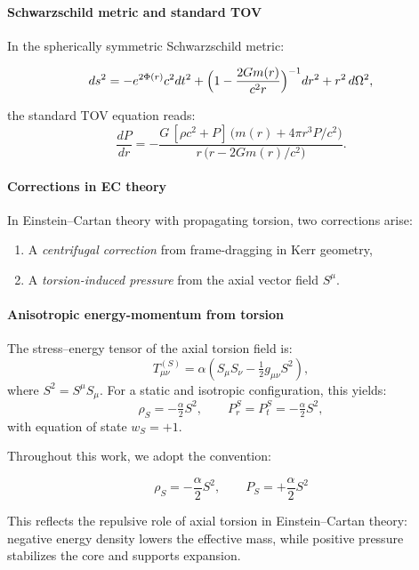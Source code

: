 \documentclass{article}
\begin{document}
\paragraph{Schwarzschild metric and standard TOV}
In the spherically symmetric Schwarzschild metric:

\begin{equation}
  ds^2 = -e^{2\Phi(r)}c^2dt^2 
        + \Bigl(1-\frac{2Gm(r)}{c^2r}\Bigr)^{-1}dr^2 
        + r^2\,d\Omega^2,
\end{equation}

the standard TOV equation reads:
\begin{equation}\label{eq:auto12}
\frac{dP}{dr}
    = -\frac{G\,[\rho c^2 + P]\,\bigl(m(r) + 4\pi r^3P/c^2\bigr)}
           {r\,\bigl(r-2Gm(r)/c^2\bigr)}.
\end{equation}

\paragraph{Corrections in EC theory}
In Einstein–Cartan theory with propagating torsion, two corrections arise:
\begin{enumerate}
  \item A \emph{centrifugal correction} from frame-dragging in Kerr geometry,
  \item A \emph{torsion-induced pressure} from the axial vector field $S^\mu$.
\end{enumerate}

\paragraph{Anisotropic energy-momentum from torsion}
The stress–energy tensor of the axial torsion field is:
\begin{equation}\label{eq:auto13}
T^{(S)}_{\mu\nu} = \alpha\left(S_\mu S_\nu - \tfrac{1}{2} g_{\mu\nu} S^2\right),
\end{equation}
where $S^2 = S^\mu S_\mu$. For a static and isotropic configuration, this yields:
\begin{equation}\label{eq:auto14}
\rho_S = -\tfrac{\alpha}{2} S^2,
  \qquad
  P_r^S = P_t^S = -\tfrac{\alpha}{2} S^2,
\end{equation}
with equation of state $w_S = +1$.

\begin{tcolorbox}[colback=gray!5, colframe=black!30, title=Torsion energy convention]
Throughout this work, we adopt the convention:

\begin{equation}
\rho_S = -\frac{\alpha}{2} S^2, \qquad P_S = +\frac{\alpha}{2} S^2
\end{equation}

This reflects the repulsive role of axial torsion in Einstein–Cartan theory:  
negative energy density lowers the effective mass,  
while positive pressure stabilizes the core and supports expansion.
\end{tcolorbox}
\end{document}
